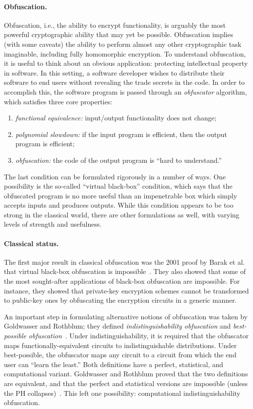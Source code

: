 \documentclass[11pt]{article}
\numberwithin{equation}{section}
\begin{document}
{\paragraph{Obfuscation.} Obfuscation, i.e., the ability to encrypt functionality, is arguably the most powerful cryptographic ability that may yet be possible. Obfuscation implies (with some caveats) the ability to perform almost any other cryptographic task imaginable, including fully homomorphic encryption. To understand obfuscation, it is useful to think about an obvious application: protecting intellectual property in software. In this setting, a software developer wishes to distribute their software to end users without revealing the trade secrets in the code. In order to accomplish this, the software program is passed through an \emph{obfuscator} algorithm, which satisfies three core properties:
\begin{enumerate}\label{def:obf-informal}
\item \emph{functional equivalence:} input/output functionality does not change;
\item \emph{polynomial slowdown:} if the input program is efficient, then the output program is efficient;
\item \emph{obfuscation:} the code of the output program is ``hard to understand.''
\end{enumerate}
The last condition can be formulated rigorously in a number of ways. One possibility is the so-called ``virtual black-box'' condition, which says that the obfuscated program is no more useful than an impenetrable box which simply accepts inputs and produces outputs. While this condition appears to be too strong in the classical world, there are other formulations as well, with varying levels of strength and usefulness.

\paragraph{Classical status.} The first major result in classical obfuscation was the 2001 proof by Barak et al. that virtual black-box obfuscation is impossible~\cite{BGIRSVY01, BGIRSVY12}. They also showed that some of the most sought-after applications of black-box obfuscation are impossible. For instance, they showed that private-key encryption schemes cannot be transformed to public-key ones by obfuscating the encryption circuits in a generic manner.

An important step in formulating alternative notions of obfuscation was taken by Goldwasser and Rothblum; they defined \emph{indistinguishability obfuscation} and \emph{best-possible obfuscation}~\cite{GR07}. Under indistinguishability, it is required that the obfuscator maps functionally-equivalent circuits to indistinguishable distributions. Under best-possible, the obfuscator maps any circuit to a circuit from which the end user can ``learn the least.'' Both definitions have a perfect, statistical, and computational variant. Goldwasser and Rothblum proved that the two definitions are equivalent, and that the perfect and statistical versions are impossible (unless the PH collapses)~\cite{GR07}. This left one possibility: computational indistinguishability obfuscation. 

}
\end{document}
